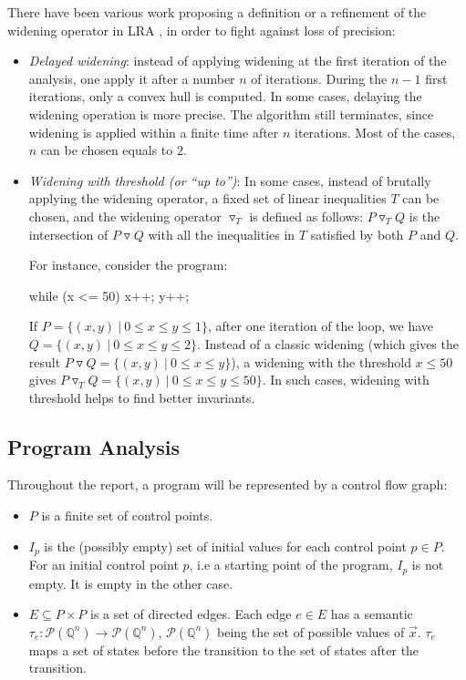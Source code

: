 \documentclass[a4paper,english,titlepage,11pt]{report}
\def\Q{\mathbb{Q}}
\def\P{\mathcal{P}}
\newcommand{\widening}{\mathop{\triangledown}}
\begin{document}
There have been various
work proposing a definition or a refinement of the widening operator in LRA
\cite{CH78,Hal79,HPR97,BlanchetCousotEtAl_PLDI03}, in order to fight
against loss of precision:
\begin{itemize}
\item \emph{Delayed widening}: instead of applying widening at the first
iteration of the analysis, one apply it after a number $n$ of iterations. During
the $n-1$ first iterations, only a convex hull is computed. In some cases,
delaying the widening operation is more precise. The algorithm still terminates,
since widening is applied within a finite time after $n$ iterations. Most of the
cases, $n$ can be chosen equals to $2$.
\item \emph{Widening with threshold (or ``up to'')}: In some cases, instead of
brutally applying the widening operator, a fixed set of linear inequalities $T$
can be chosen, and the widening operator $\widening_T$ is defined as follows:
$P \widening_T Q$ is the intersection of $P \widening Q$ with all the inequalities in
$T$ satisfied by both $P$ and $Q$.

For instance, consider the program:
\begin{C}
while (x <= 50) {
	x++;
	y++;
}
\end{C}
If $P = \{(x,y)\ |\ 0 \leq x \leq y \leq 1 \}$, after one iteration of the loop,
we have $Q = \{(x,y)\ |\ 0 \leq x \leq y \leq 2 \}$. Instead of a classic
widening (which gives the result $P \widening Q = \{(x,y)\ |\ 0 \leq x \leq y \}$),
a widening with the threshold $x \leq 50$ gives 
$P \widening_T Q = \{(x,y)\ |\ 0 \leq x \leq y \leq 50\}$. In such cases, widening
with threshold helps to find better invariants.
\end{itemize}

\subsection{Program Analysis}

Throughout the report, a program will be represented by a control flow graph:
\begin{itemize}
\item $P$ is a finite set of control points.
\item $I_p$ is the (possibly empty)
set of initial values for each control point $p \in P$. For an initial control
point $p$, i.e a starting point of the program, $I_p$ is not empty. It is empty
in the other case.
\item $E \subseteq  P \times P$ is a set of directed edges. Each edge $e \in E$
has a semantic $\tau_e: \P(\Q^n) \rightarrow \P(\Q^n)$, $\P(\Q^n)$ being the set
of possible values of $\overrightarrow{x}$. $\tau_e$ maps a set of states before
the transition to the set of states after the transition.
\end{itemize}
\end{document}
